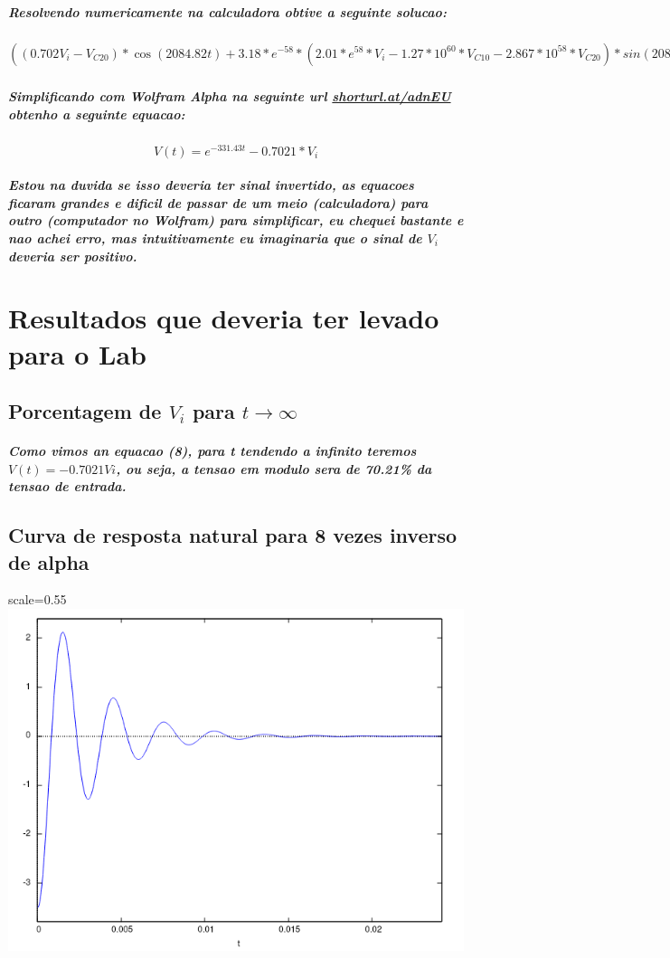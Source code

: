 \documentclass[12pt,twoside, a4paper, twocolumn]{article}
\begin{document}
\subparagraph*{Resolvendo numericamente na calculadora obtive a seguinte solucao:}

\subparagraph*{$((0.702 V_i - V_{C20})*\cos{(2084.82t)}+3.18*e^{-58}*(2.01*e^{58}*V_i-1.27*10^{60}*V_{C10}-2.867*10^{58}*V_{C20})*sin(2084.82t))*e^{(-331.43t)} - 0.7021 * V_i$}


\subparagraph*{Simplificando com Wolfram Alpha na seguinte url \url{shorturl.at/adnEU} obtenho a seguinte equacao:}

\begin{equation}
    V(t) = e^{-331.43t} - 0.7021 * V_i
\end{equation}

\subparagraph*{Estou na duvida se isso deveria ter sinal invertido, as equacoes ficaram grandes e dificil de passar de um meio (calculadora) para outro (computador no Wolfram) para simplificar, eu chequei bastante e nao achei erro, mas intuitivamente eu imaginaria que o sinal de $V_i$ deveria ser positivo.}

\section{Resultados que deveria ter levado para o Lab}

\subsection{Porcentagem de $V_i$ para $t \rightarrow \infty$}
\subparagraph*{Como vimos an equacao (8), para t tendendo a infinito teremos $V(t) = -0.7021 Vi$, ou seja, a tensao em modulo sera de 70.21\% da tensao de entrada.}

\subsection{Curva de resposta natural para 8 vezes inverso de alpha}

\begin{adjustbox}{scale=0.55}
    \includegraphics{Figure_3.png}
\end{adjustbox}
\end{document}
